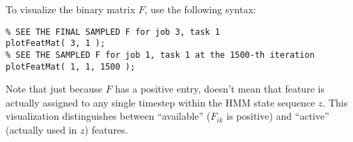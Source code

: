 \documentclass[fontsize=12]{article}
\begin{document}
To visualize the binary matrix $F$, use the following syntax:
\begin{verbatim}
% SEE THE FINAL SAMPLED F for job 3, task 1
plotFeatMat( 3, 1 );
% SEE THE SAMPLED F for job 1, task 1 at the 1500-th iteration
plotFeatMat( 1, 1, 1500 );
\end{verbatim}

Note that just because $F$ has a positive entry, doesn't mean that feature is actually assigned to any single timestep within the HMM state sequence $z$.  This visualization distinguishes between ``available'' ($F_{ik}$ is positive) and ``active'' (actually used in $z$) features. 
\end{document}
